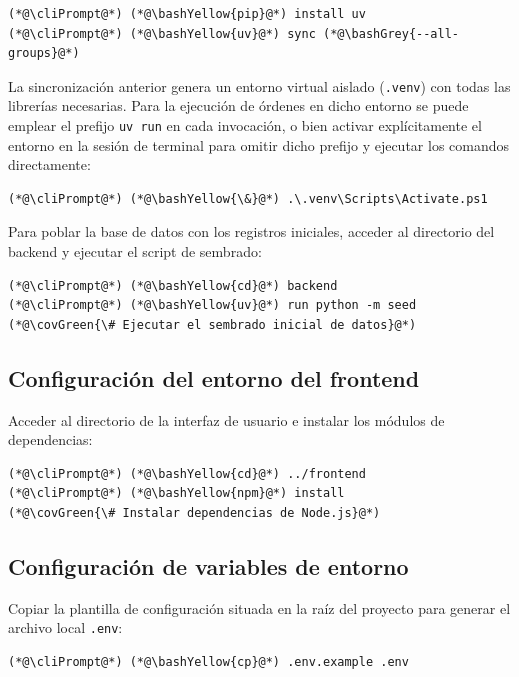 \begin{appendices}
\begin{lstlisting}
(*@\cliPrompt@*) (*@\bashYellow{pip}@*) install uv
(*@\cliPrompt@*) (*@\bashYellow{uv}@*) sync (*@\bashGrey{--all-groups}@*)
\end{lstlisting}

La sincronización anterior genera un entorno virtual aislado (\texttt{.venv}) con todas las librerías necesarias. Para la ejecución de órdenes en dicho entorno se puede emplear el prefijo \texttt{uv run} en cada invocación, o bien activar explícitamente el entorno en la sesión de terminal para omitir dicho prefijo y ejecutar los comandos directamente:

\begin{lstlisting}
(*@\cliPrompt@*) (*@\bashYellow{\&}@*) .\.venv\Scripts\Activate.ps1
\end{lstlisting}

Para poblar la base de datos con los registros iniciales, acceder al directorio del backend y ejecutar el script de sembrado:

\begin{lstlisting}
(*@\cliPrompt@*) (*@\bashYellow{cd}@*) backend
(*@\cliPrompt@*) (*@\bashYellow{uv}@*) run python -m seed            (*@\covGreen{\# Ejecutar el sembrado inicial de datos}@*)
\end{lstlisting}

\subsection*{Configuración del entorno del frontend}
Acceder al directorio de la interfaz de usuario e instalar los módulos de dependencias:

\begin{lstlisting}
(*@\cliPrompt@*) (*@\bashYellow{cd}@*) ../frontend
(*@\cliPrompt@*) (*@\bashYellow{npm}@*) install                          (*@\covGreen{\# Instalar dependencias de Node.js}@*)
\end{lstlisting}

\subsection*{Configuración de variables de entorno}\label{subsec:manual_env}
Copiar la plantilla de configuración situada en la raíz del proyecto para generar el archivo local \texttt{.env}:

\begin{lstlisting}
(*@\cliPrompt@*) (*@\bashYellow{cp}@*) .env.example .env
\end{lstlisting}


\end{appendices}
